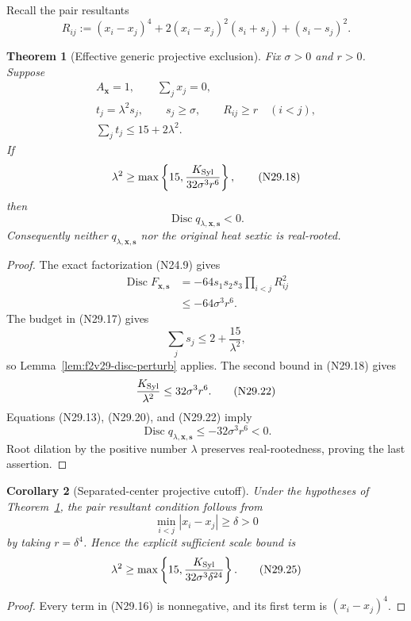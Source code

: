 \documentclass[11pt]{article}
\newtheorem{theorem}{Theorem}[section]
\newtheorem{corollary}[theorem]{Corollary}
\theoremstyle{definition}
\theoremstyle{remark}
\begin{document}
Recall the pair resultants
\[
 R_{ij}:=(x_i-x_j)^4
 +2(x_i-x_j)^2(s_i+s_j)+(s_i-s_j)^2.
 \tag{N29.16}
\]

\begin{theorem}[Effective generic projective exclusion]
\label{thm:f2v29-projective}
Fix \(\sigma>0\) and \(r>0\).  Suppose
\[
\begin{gathered}
 A_{\bm x}=1,\qquad \sum_jx_j=0,\\
 t_j=\lambda^2s_j,\qquad
 s_j\geq\sigma,\qquad
 R_{ij}\geq r\quad(i<j),\\
 \sum_jt_j\leq15+2\lambda^2.
\end{gathered}
\tag{N29.17}
\]
If
\[
 \lambda^2\geq
 \max\left\{15,\frac{K_{\rm Syl}}
 {32\sigma^3r^6}\right\},
 \tag{N29.18}
\]
then
\[
 \operatorname{Disc}
 q_{\lambda,\bm x,\bm s}<0.
 \tag{N29.19}
\]
Consequently neither \(q_{\lambda,\bm x,\bm s}\) nor the original heat
sextic is real-rooted.
\end{theorem}

\begin{proof}
The exact factorization \textup{(N24.9)} gives
\[
\begin{aligned}
 \operatorname{Disc}F_{\bm x,\bm s}
 &=-64s_1s_2s_3\prod_{i<j}R_{ij}^2\\
 &\leq-64\sigma^3r^6.
\end{aligned}
\tag{N29.20}
\]
The budget in \textup{(N29.17)} gives
\[
 \sum_js_j\leq2+\frac{15}{\lambda^2},
 \tag{N29.21}
\]
so Lemma~\ref{lem:f2v29-disc-perturb} applies.  The second bound in
\textup{(N29.18)} gives
\[
 \frac{K_{\rm Syl}}{\lambda^2}
 \leq32\sigma^3r^6.
 \tag{N29.22}
\]
Equations \textup{(N29.13)}, \textup{(N29.20)}, and
\textup{(N29.22)} imply
\[
 \operatorname{Disc}q_{\lambda,\bm x,\bm s}
 \leq-32\sigma^3r^6<0.
 \tag{N29.23}
\]
Root dilation by the positive number \(\lambda\) preserves
real-rootedness, proving the last assertion.
\end{proof}

\begin{corollary}[Separated-center projective cutoff]
\label{cor:f2v29-separated}
Under the hypotheses of Theorem~\ref{thm:f2v29-projective}, the pair
resultant condition follows from
\[
 \min_{i<j}|x_i-x_j|\geq\delta>0
 \tag{N29.24}
\]
by taking \(r=\delta^4\).  Hence the explicit sufficient scale bound is
\[
 \lambda^2\geq
 \max\left\{15,\frac{K_{\rm Syl}}
 {32\sigma^3\delta^{24}}\right\}.
 \tag{N29.25}
\]
\end{corollary}

\begin{proof}
Every term in \textup{(N29.16)} is nonnegative, and its first term is
\((x_i-x_j)^4\).
\end{proof}
\end{document}
